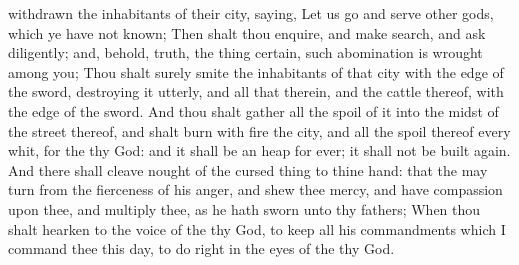 {withdrawn the
inhabitants of their
city,
saying, Let us
go and
serve
other
gods, which ye have not
known;
Then shalt thou
enquire, and make
search, and
ask
diligently; and, behold,
{}
truth,
{} the
thing
certain,
{}
such
abomination is
wrought
among you;
Thou shalt
surely
smite the
inhabitants of that
city with the
edge of the
sword, destroying it
utterly, and all that
{} therein, and the
cattle thereof, with the
edge of the
sword.
And thou shalt
gather all the
spoil of it into the
midst of the
street thereof, and shalt
burn with
fire the
city, and all the
spoil thereof every
whit, for the
{} thy
God: and it shall be an
heap for
ever; it shall not be built
again.
And there shall
cleave
nought of the cursed
thing to thine
hand: that the
{} may
turn from the
fierceness of his
anger, and
shew thee
mercy, and have
compassion upon thee, and
multiply thee, as he hath
sworn unto thy
fathers;
When thou shalt
hearken to the
voice of the
{} thy
God, to
keep all his
commandments which I
command thee this
day, to
do
{}
right in the
eyes of the
{} thy
God.

}
